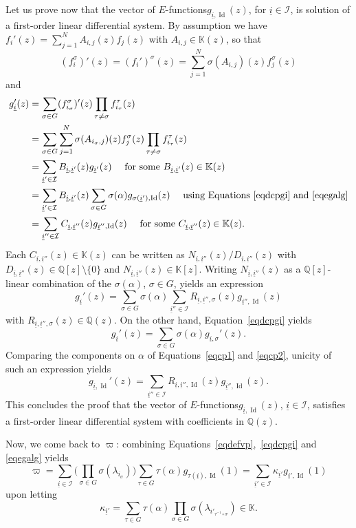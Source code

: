 \documentclass[JEP,XML,SOM,Unicode,published]{cedram}
\newcommand{\Efunctions}{$E$\nobreakdash-func\-tions\xspace}
\theoremstyle{definition}
\newcommand{\Q}{\mathbb{Q}}
\newcommand{\K}{\mathbb{K}}
\DeclareMathOperator{\Id}{Id}
\newcommand{\calI}{\mathcal I}
\newcommand{\isoul}{{\underline{i}}}
\begin{document}
Let us prove now that the vector of \Efunctions $g_{ \isoul ,\Id}(z)$, for $\isoul\in\calI$, is solution of a first-order linear differential system. By assumption we have $f_i'(z) = \sum_{j=1}^N A_{i,j}(z) f_j(z)$ with $A_{i,j}\in\K(z)$, so that
\[
(f_i^\sigma)'(z) = (f_i')^\sigma(z)=\sum_{j=1}^N \sigma(A_{i,j})(z) f_j^\sigma(z)
\]
and
\begin{align*}
g_\isoul '(z)
&=\sum_{\sigma\in G} ( f_{i_\sigma}^\sigma)'(z) \prod_{\tau\neq \sigma}
f_{i_\tau}^\tau (z)\\
&= \sum_{\sigma\in G} \sum_{j=1}^N \sigma(A_{i_\sigma,j})(z) f_j^\sigma(z)
\prod_{\tau\neq \sigma} f_{i_\tau}^\tau(z) \\
&= \sum_{\isoul' \in\calI } B_{\isoul,\isoul'}(z)g_{\isoul'}(z) \quad \mbox{ for some }
B_{\isoul,\isoul'}(z)\in\K(z)\\
&= \sum_{\isoul' \in\calI } B_{\isoul,\isoul'}(z) \sum_{\sigma\in G} \sigma(\alpha) g_{\sigma(\isoul'),\Id}(z) \quad \mbox{ using Equations~\eqref{eqdcpgi} and \eqref{eqegalg}}\\
&= \sum_{\isoul'' \in\calI } C_{\isoul,\isoul''}(z) g_{\isoul'',\Id}(z) \quad \mbox{ for some }
C_{\isoul,\isoul''}(z)\in\K(z).
\end{align*}
Each $C_{\isoul,\isoul''}(z)\in\K(z)$ can be written as $N_{\isoul,\isoul''}(z)/D_{\isoul,\isoul''}(z)$ with $D_{\isoul,\isoul''}(z)\in\Q[z]\setminus\{0\}$ and $N_{\isoul,\isoul''}(z)\in\K[z]$. Writing $N_{\isoul,\isoul''}(z)$ as a $\Q[z]$-linear combination of the $\sigma(\alpha)$, $\sigma\in G$, yields an expression
\begin{equation} \label{eqcp1}
g_\isoul '(z) = \sum_{\sigma\in G} \sigma(\alpha)\sum_{\isoul'' \in\calI } R_{\isoul,\isoul'',\sigma}(z) g_{\isoul'',\Id}(z)
\end{equation}
with $R_{\isoul,\isoul'',\sigma}(z) \in\Q(z) $. On the other hand, Equation~\eqref{eqdcpgi} yields
\begin{equation} \label{eqcp2}
g_\isoul '(z) = \sum_{\sigma\in G} \sigma(\alpha) g_{\isoul ,\sigma}'(z).
\end{equation}
Comparing the components on $\alpha$ of Equations~\eqref{eqcp1} and \eqref{eqcp2}, unicity of such an expression yields
\[
g_{\isoul ,\Id}'(z) = \sum_{\isoul'' \in\calI }R_{\isoul,\isoul'',\Id}(z) g_{\isoul'',\Id}(z) .
\]
This concludes the proof that the vector of \Efunctions $g_{ \isoul ,\Id}(z)$, $\isoul\in\calI$, satisfies a first-order linear differential system with coefficients in $\Q(z)$.

Now, we come back to $\varpi$: combining Equations~\eqref{eqdefvp},~\eqref{eqdcpgi} and \eqref{eqegalg} yields
\begin{equation} \label{eqdcpsurQ}
\varpi = \sum_{\isoul\in\calI} \Big( \prod_{\sigma\in G} \sigma(\lambda_{i_\sigma})\Big)
\sum_{\tau\in G}\tau(\alpha) g_{\tau(\isoul), \Id}(1) = \sum_{\isoul'\in\calI} \kappa_{\isoul'} g_{\isoul', \Id}(1)
\end{equation}
upon letting
\[
\kappa_{\isoul'} = \sum_{\tau\in G}\tau(\alpha)\prod_{\sigma\in G} \sigma(\lambda_{i'_{\tau^{-1}\circ\sigma}})\in\K.
\]
\end{document}
